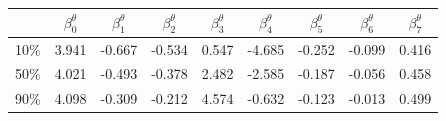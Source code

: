 \begin{tabular}{ccccccccc}
\hline
 & $\beta_0^{\theta}$ & $\beta_1^{\theta}$ & $\beta_2^{\theta}$ & $\beta_3^{\theta}$ & $\beta_4^{\theta}$ & $\beta_5^{\theta}$ & $\beta_6^{\theta}$ & $\beta_7^{\theta}$ \\
\hline
10\% & 3.941 & -0.667 & -0.534 & 0.547 & -4.685 & -0.252 & -0.099 & 0.416 \\
50\% & 4.021 & -0.493 & -0.378 & 2.482 & -2.585 & -0.187 & -0.056 & 0.458 \\
90\% &  4.098 & -0.309 & -0.212 & 4.574 & -0.632 & -0.123 & -0.013 & 0.499 \\

\hline
\end{tabular}